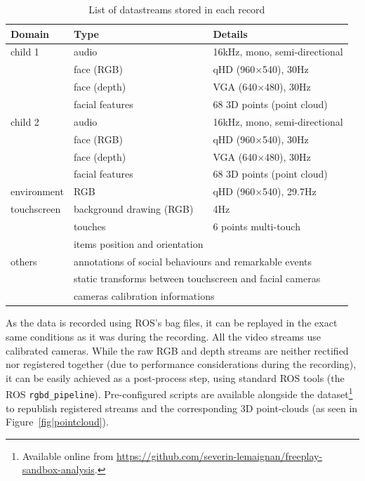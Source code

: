 \documentclass{article}
\begin{document}
\begin{table}[]
\centering
\caption{List of datastreams stored in each record}
\label{table|datastreams}
\begin{tabular}{@{}lll@{}}
\toprule
\bf Domain  & \bf Type                              & \bf Details                          \\ \midrule
child 1     & audio                                 & 16kHz, mono, semi-directional        \\
            & face (RGB)                            & qHD (960$\times$540), 30Hz           \\
            & face (depth)                          & VGA (640$\times$480), 30Hz           \\
            & facial features                       & 68 3D points (point cloud)           \\ \midrule
child 2     & audio                                 & 16kHz, mono, semi-directional        \\
            & face (RGB)                            & qHD (960$\times$540), 30Hz           \\
            & face (depth)                          & VGA (640$\times$480), 30Hz           \\
            & facial features                       & 68 3D points (point cloud)           \\ \midrule
environment & RGB                                   & qHD (960$\times$540), 29.7Hz         \\ \midrule
touchscreen & background drawing (RGB)              & 4Hz                                  \\
            & touches                               & 6 points multi-touch                 \\
            & items position and orientation        &                                      \\ \midrule
others      & \multicolumn{2}{l}{annotations of social behaviours and remarkable events}   \\
            & \multicolumn{2}{l}{static transforms between touchscreen and facial cameras} \\
            & \multicolumn{2}{l}{cameras calibration informations}                         \\ \bottomrule
\end{tabular}
\end{table}

As the data is recorded using ROS's bag files, it can be replayed in the exact
same conditions as it was during the recording. All the video streams use
calibrated cameras. While the raw RGB and depth streams are neither rectified
nor registered together (due to performance considerations during the
recording), it can be easily achieved as a post-process step, using standard ROS
tools (the ROS {\tt rgbd\_pipeline}). Pre-configured scripts are available
alongside the
dataset\footnote{Available online from
\url{https://github.com/severin-lemaignan/freeplay-sandbox-analysis}.} to
republish registered streams and the corresponding 3D point-clouds (as seen in
Figure~\ref{fig|pointcloud}).
\end{document}
